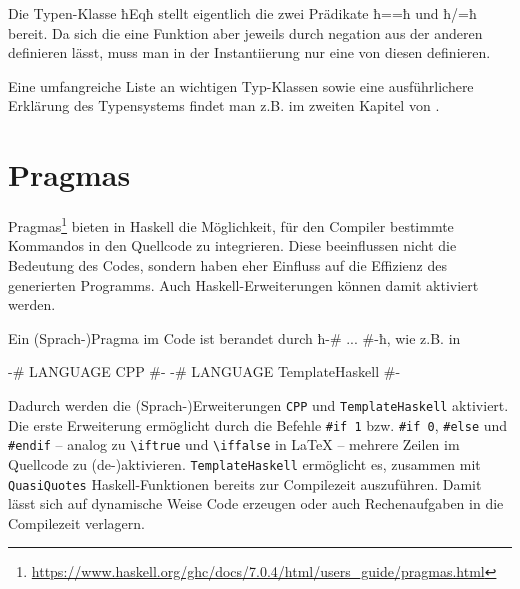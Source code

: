 Die Typen-Klasse ħEqħ stellt eigentlich die zwei Prädikate ħ==ħ und ħ/=ħ
bereit. Da sich die eine Funktion aber jeweils durch negation aus der anderen
definieren lässt, muss man in der Instantiierung nur eine von diesen definieren.

Eine umfangreiche Liste an wichtigen Typ-Klassen sowie eine ausführlichere
Erklärung des Typensystems findet man z.B.
im zweiten Kapitel von \autocite{lyahfgg}.

\section{Pragmas}
Pragmas\footnote{\url{https://www.haskell.org/ghc/docs/7.0.4/html/users_guide/pragmas.html}}
bieten in Haskell die Möglichkeit, für den Compiler bestimmte Kommandos in den
Quellcode zu integrieren. Diese beeinflussen nicht die Bedeutung des
Codes, sondern haben eher Einfluss auf die Effizienz des generierten Programms.
Auch Haskell-Erweiterungen können damit aktiviert werden.

Ein (Sprach-)Pragma im Code ist berandet durch ħ{-# ... #-}ħ, wie z.B. in
\begin{hcode}
{-# LANGUAGE CPP #-}
{-# LANGUAGE TemplateHaskell #-}
\end{hcode}
Dadurch werden die (Sprach-)Erweiterungen \texttt{CPP} und
\texttt{TemplateHaskell} aktiviert. Die erste Erweiterung ermöglicht durch
die Befehle \texttt{\#if 1} bzw. \texttt{\#if 0}, \texttt{\#else} und
\texttt{\#endif} -- analog zu \verb!\iftrue! und
\verb!\iffalse! in \LaTeX{} -- mehrere Zeilen im Quellcode zu
(de-)aktivieren.
\texttt{TemplateHaskell} ermöglicht es, zusammen mit \texttt{QuasiQuotes}
Haskell-Funktionen bereits zur Compilezeit auszuführen. Damit lässt sich
auf dynamische Weise Code erzeugen oder auch Rechenaufgaben in die Compilezeit
verlagern.

